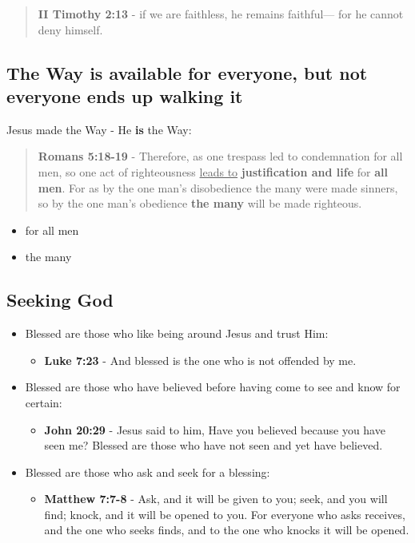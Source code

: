 \documentclass[11pt]{article}
\begin{document}
\begin{quote}
\textbf{II Timothy 2:13} - if we are faithless, he remains faithful— for he cannot deny himself.
\end{quote}

\subsection{The Way is available for everyone, but not everyone ends up walking it}
\label{sec:org45f4ebb}
Jesus made the Way - He \textbf{is} the Way:

\begin{quote}
\textbf{Romans 5:18-19} - Therefore, as one trespass led to condemnation for all men, so one act of righteousness \uline{leads to} \textbf{justification and life} for \textbf{all men}. For as by the one man's disobedience the many were made sinners, so by the one man's obedience \textbf{the many} will be made righteous.
\end{quote}

\begin{itemize}
\item for all men
\item the many
\end{itemize}

\subsection{Seeking God}
\label{sec:orge7e3051}
\begin{itemize}
\item Blessed are those who like being around Jesus and trust Him:
\begin{itemize}
\item \textbf{Luke 7:23} - And blessed is the one who is not offended by me.
\end{itemize}

\item Blessed are those who have believed before having come to see and know for certain:
\begin{itemize}
\item \textbf{John 20:29} - Jesus said to him, Have you believed because you have seen me? Blessed are those who have not seen and yet have believed.􇩙
\end{itemize}

\item Blessed are those who ask and seek for a blessing:
\begin{itemize}
\item \textbf{Matthew 7:7-8} - Ask, and it will be given to you; seek, and you will find; knock, and it will be opened to you. For everyone who asks receives, and the one who seeks finds, and to the one who knocks it will be opened.
\end{itemize}
\end{itemize}
\end{document}
